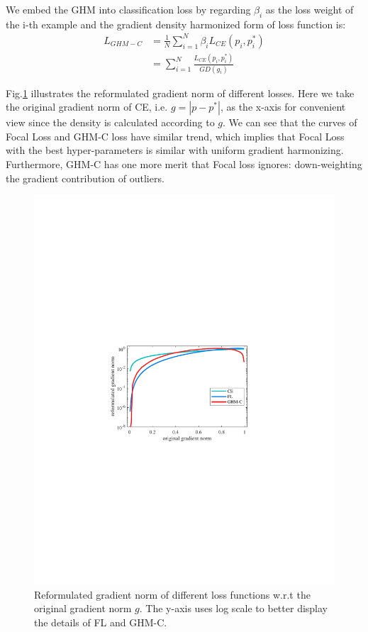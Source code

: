 \documentclass[letterpaper]{article} %
\begin{document}
We embed the GHM into classification loss by regarding $\beta_i$ as the loss weight of the i-th example and the gradient density harmonized form of loss function is:
\begin{equation}
\label{eq:lghm}
    \begin{aligned}
    L_{GHM-C} &= \frac{1}{N}\sum_{i=1}^N\beta_i L_{CE}(p_i, p_i^*) \\
    &= \sum_{i=1}^N\frac{L_{CE}(p_i, p_i^*)}{GD(g_i)} 
    \end{aligned}
\end{equation}

Fig.\ref{fig:cls_grads} illustrates the reformulated gradient norm of different losses. Here we take the original gradient norm of CE, i.e. $g = |p-p^*|$, as the x-axis for convenient view since the density is calculated according to $g$. We can see that the curves of Focal Loss and GHM-C loss have similar trend, which implies that Focal Loss with the best hyper-parameters is similar with uniform gradient harmonizing. Furthermore, GHM-C has one more merit that Focal loss ignores: down-weighting the gradient contribution of outliers.
\begin{figure}[ht]
\centering
\includegraphics[width=0.8\linewidth]{figs/cls_grads}
\caption{Reformulated gradient norm of different loss functions w.r.t the original gradient norm $g$. The y-axis uses log scale to better display the details of FL and GHM-C.}
\label{fig:cls_grads}
\end{figure}
\end{document}
